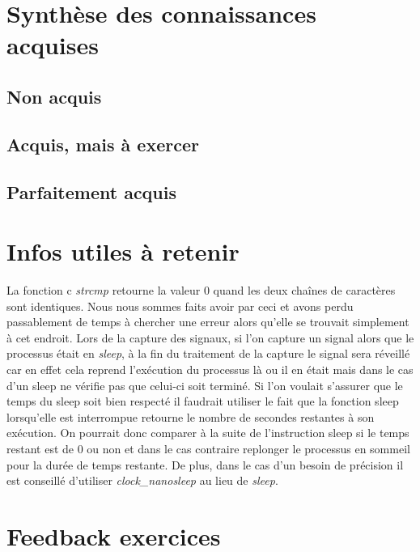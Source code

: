 \documentclass{ReportTemplate}
\begin{document}
\section{Synthèse des connaissances acquises}
\subsection{Non acquis}

\subsection{Acquis, mais à exercer}

\subsection{Parfaitement acquis}

\section{Infos utiles à retenir}
La fonction c \textit{strcmp} retourne la valeur 0 quand les deux chaînes de
caractères sont identiques. Nous nous sommes faits avoir par ceci et avons perdu
passablement de temps à chercher une erreur alors qu'elle se trouvait simplement
à cet endroit.\newline
Lors de la capture des signaux, si l'on capture un signal alors que le processus
était en \textit{sleep}, à la fin du traitement de la capture le signal sera
réveillé car en effet cela reprend l'exécution du processus là ou il en était
mais dans le cas d'un sleep ne vérifie pas que celui-ci soit terminé. Si l'on
voulait s'assurer que le temps du sleep soit bien respecté il faudrait utiliser
le fait que la fonction sleep lorsqu'elle est interrompue retourne le nombre de
secondes restantes à son exécution. On pourrait donc comparer à la suite de
l'instruction sleep si le temps restant est de 0 ou non et dans le cas contraire
replonger le processus en sommeil pour la durée de temps restante. De plus, dans
le cas d'un besoin de précision il est conseillé d'utiliser \textit{clock\_nanosleep} au lieu de \textit{sleep}.

\section{Feedback exercices}
\end{document}
